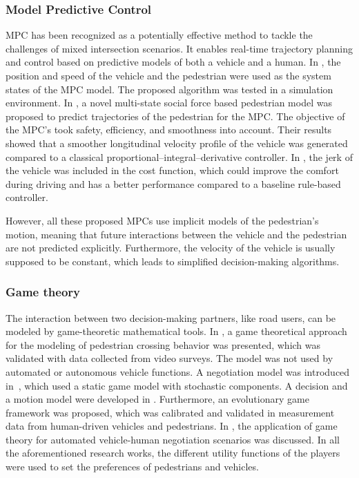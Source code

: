 \documentclass[conference]{IEEEtran}
\begin{document}
	\vspace*{2mm}
	\subsubsection{Model Predictive Control}
	MPC has been recognized as a potentially effective method to tackle the challenges of mixed intersection scenarios. It enables real-time trajectory planning and control based on predictive models of both a vehicle and a human. In \cite{2021_AutomatedVehicleBehavior_jayaraman}, the position and speed of the vehicle and the pedestrian were used as the system states of the MPC model. The proposed algorithm was tested in a simulation environment. In \cite{2020_MultiStateSocialForce_yang, 2019_CombiningSocialForce_yang}, a novel multi-state social force based pedestrian model was proposed to predict trajectories of the pedestrian for the MPC. The objective of the MPC's took safety, efficiency, and smoothness into account. Their results showed that a smoother longitudinal velocity profile of the vehicle was generated compared to a classical proportional–integral–derivative controller. In \cite{2020_EfficientBehaviorawareControl_jayaraman}, the jerk of the vehicle was included in the cost function, which could improve the comfort during driving and has a better performance compared to a baseline rule-based controller. 
	
	However, all these proposed MPCs use implicit models of the pedestrian's motion, meaning that future interactions between the vehicle and the pedestrian are not predicted explicitly. Furthermore, the velocity of the vehicle is usually supposed to be constant, which leads to simplified decision-making algorithms.
	
	\vspace*{2mm}
	\subsubsection{Game theory}
	The interaction between two decision-making partners, like road users, can be modeled by game-theoretic mathematical tools.
	In \cite{2021_GameTheoreticApproach_amini}, a game theoretical approach for the modeling of pedestrian crossing behavior was presented, which was validated with data collected from video surveys. The model was not used by automated or autonomous vehicle functions. A negotiation model was introduced in~\cite{2020_AnalysisGameTheorybased_skugor}, which used a static game model with stochastic components. 
	A decision and a motion model were developed in \cite{2016_InteractionVehiclesPedestrians_chen}. Furthermore, an evolutionary game framework was proposed, which was calibrated and validated in measurement data from human-driven vehicles and pedestrians. In \cite{2018_WhenShouldChicken_fox}, the application of game theory for automated vehicle-human negotiation scenarios was discussed. In all the aforementioned research works, the different utility functions of the players were used to set the preferences of pedestrians and vehicles.
	
\end{document}
